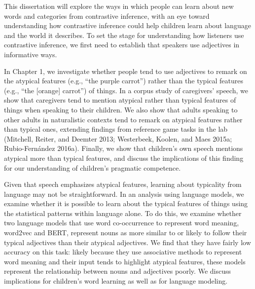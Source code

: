 \documentclass{ucetd}
\begin{document}
This dissertation will explore the ways in which people can learn about
new words and categories from contrastive inference, with an eye toward
understanding how contrastive inference could help children learn about
language and the world it describes. To set the stage for understanding
how listeners use contrastive inference, we first need to establish that
speakers use adjectives in informative ways.

In Chapter 1, we investigate whether people tend to use adjectives to
remark on the atypical features (e.g., ``the purple carrot'') rather
than the typical features (e.g., ``the {[}orange{]} carrot'') of things.
In a corpus study of caregivers' speech, we show that caregivers tend to
mention atypical rather than typical features of things when speaking to
their children. We also show that adults speaking to other adults in
naturalistic contexts tend to remark on atypical features rather than
typical ones, extending findings from reference game tasks in the lab
(Mitchell, Reiter, and Deemter 2013; Westerbeek, Koolen, and Maes 2015a;
Rubio-Fernández 2016a). Finally, we show that children's own speech
mentions atypical more than typical features, and discuss the
implications of this finding for our understanding of children's
pragmatic competence.

Given that speech emphasizes atypical features, learning about
typicality from language may not be straightforward. In an analysis
using language models, we examine whether it is possible to learn about
the typical features of things using the statistical patterns within
language alone. To do this, we examine whether two language models that
use word co-occurrence to represent word meaning, word2vec and BERT,
represent nouns as more similar to or likely to follow their typical
adjectives than their atypical adjectives. We find that they have fairly
low accuracy on this task: likely because they use associative methods
to represent word meaning and their input tends to highlight atypical
features, these models represent the relationship between nouns and
adjectives poorly. We discuss implications for children's word learning
as well as for language modeling.
\end{document}
